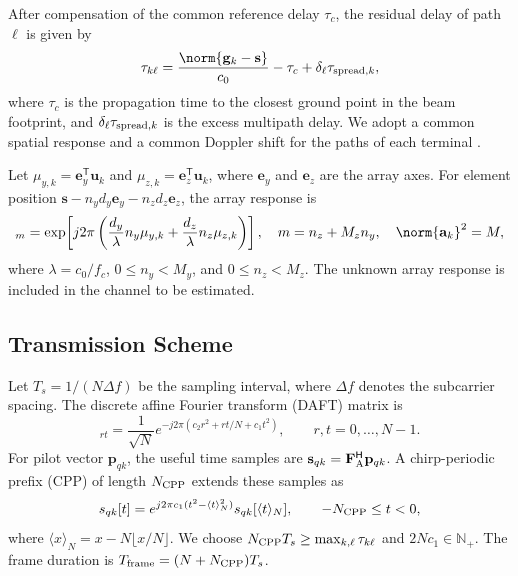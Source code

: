 After compensation of the common reference delay $\tau_c$, the residual
delay of path $\ell$ is given by
\begin{equation}
 \tau_{k\ell}=\frac{\norm{\mathbf{g}_k-\mathbf{s}}}{c_0}-\tau_c
             +\delta_\ell\tau_{{\rm spread},k},
 \label{eq:path-delay}
\end{equation}
where $\tau_c$ is the propagation time to the closest ground point in the
beam footprint, and $\delta_\ell\tau_{{\rm spread},k}$ is the excess
multipath delay. We adopt a common spatial response and a common Doppler
shift for the paths of each terminal
\cite[Sec.~II-C]{li2023}\cite[Sec.~II]{huang2026}.

Let $\mu_{y,k}=\mathbf e_y^{\mathsf T}\mathbf u_k$ and
$\mu_{z,k}=\mathbf e_z^{\mathsf T}\mathbf u_k$, where $\mathbf e_y$ and
$\mathbf e_z$ are the array axes. For element position
$\mathbf s-n_yd_y\mathbf e_y-n_zd_z\mathbf e_z$, the array response is
\begin{equation}
 [\mathbf{a}_k]_m=
 \exp\!\left[j2\pi\left(
 \frac{d_y}{\lambda}n_y\mu_{y,k}
 +\frac{d_z}{\lambda}n_z\mu_{z,k}\right)\right],
 \quad m=n_z+M_zn_y,\quad \norm{\mathbf{a}_k}^2=M,
 \label{eq:upa}
\end{equation}
where $\lambda=c_0/f_c$, $0\leq n_y<M_y$, and $0\leq n_z<M_z$.
The unknown array response is included in the channel to be estimated.

\subsection{Transmission Scheme}

Let $T_s=1/(N\Delta f)$ be the sampling interval, where $\Delta f$
denotes the subcarrier spacing. The discrete affine Fourier transform
(DAFT) matrix is \cite[Secs.~II-B and III-A]{bemani2022}
\begin{equation}
 [\mathbf{F}_{\rm A}]_{rt}=\frac{1}{\sqrt N}
 e^{-j2\pi(c_2r^2+rt/N+c_1t^2)},
 \qquad r,t=0,\ldots,N-1.
 \label{eq:daft}
\end{equation}
For pilot vector $\mathbf p_{qk}$, the useful time samples are
$\mathbf s_{qk}=\mathbf F_{\rm A}^{\mathsf H}\mathbf p_{qk}$.
A chirp-periodic prefix (CPP) of length $N_{\rm CPP}$ extends these samples as
\begin{equation}
 s_{qk}[t]=e^{j2\pi c_1(t^2-\langle t\rangle_N^2)}
 s_{qk}[\langle t\rangle_N],\qquad -N_{\rm CPP}\leq t<0,
 \label{eq:cpp}
\end{equation}
where $\langle x\rangle_N=x-N\lfloor x/N\rfloor$.
We choose $N_{\rm CPP}T_s\geq\max_{k,\ell}\tau_{k\ell}$ and
$2Nc_1\in\mathbb N_+$. The frame duration is
$T_{\rm frame}=(N+N_{\rm CPP})T_s$.

